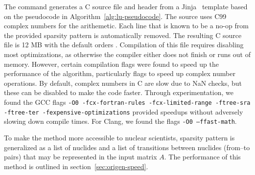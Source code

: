 The command generates a C source file and header from a
Jinja~\cite{ationneeded} template based on the pseudocode in
Algorithm~\ref{alg:lu-pseudocode}. The source uses C99 complex numbers for the
arithemetic. Each line that is known to be a no-op from the provided sparsity
pattern is automatically removed. The resulting C source file is 12 MB with
the default orders . Compilation
of this file requires disabling most optimizations, as otherwise the compiler
either does not finish or runs out of memory. However, certain compilation
flags were found to speed up the performance of the algorithm, particularly
flags to speed up complex number operations. By default, complex numbers in C
are slow due to NaN checks, but these can be disabled to make the code
faster.  Through
experimentation, we found the GCC flags \texttt{-O0 -fcx-fortran-rules
  -fcx-limited-range -ftree-sra -ftree-ter -fexpensive-optimizations} provided
speedups without adversely slowing down compile times. For Clang, we found the
flags \texttt{-O0 --ffast-math}. 

To make the method more accessible to nuclear scientists, sparsity pattern is
generalized as a list of nuclides and a list of transitions between nuclides
(from--to pairs) that may be represented in the input matrix $A$. The
performance of this method is outlined in section~\ref{sec:origen-speed}.
